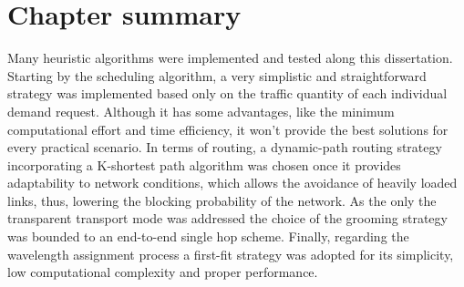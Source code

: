 \section{Chapter summary}

Many heuristic algorithms were implemented and tested along this dissertation. Starting by the scheduling algorithm, a very simplistic and straightforward strategy was implemented based only on the traffic quantity of each individual demand request. Although it has some advantages, like the minimum computational effort and time efficiency, it won't provide the best solutions for every practical scenario. In terms of routing, a dynamic-path routing strategy incorporating a K-shortest path algorithm was chosen once it provides adaptability to network conditions, which allows the avoidance of heavily loaded links, thus, lowering the blocking probability of the network. As the only the transparent transport mode was addressed the choice of the grooming strategy was bounded to an end-to-end single hop scheme. Finally, regarding the wavelength assignment process a first-fit strategy was adopted for its simplicity, low computational complexity and proper performance.


\cleardoublepage



